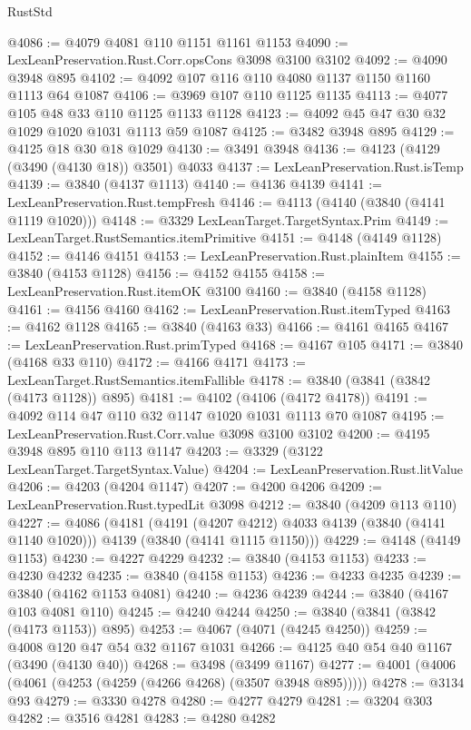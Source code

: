 \begin{lexlean}{RustStd}
\begin{coremodule}
@4086 := @4079 @4081 @110 @1151 @1161 @1153
@4090 := LexLeanPreservation.Rust.Corr.opsCons @3098 @3100 @3102
@4092 := @4090 @3948 @895
@4102 := @4092 @107 @116 @110 @4080 @1137 @1150 @1160 @1113 @64 @1087
@4106 := @3969 @107 @110 @1125 @1135
@4113 := @4077 @105 @48 @33 @110 @1125 @1133 @1128
@4123 := @4092 @45 @47 @30 @32 @1029 @1020 @1031 @1113 @59 @1087
@4125 := @3482 @3948 @895
@4129 := @4125 @18 @30 @18 @1029
@4130 := @3491 @3948
@4136 := @4123 (@4129 (@3490 (@4130 @18)) @3501) @4033
@4137 := LexLeanPreservation.Rust.isTemp
@4139 := @3840 (@4137 @1113)
@4140 := @4136 @4139
@4141 := LexLeanPreservation.Rust.tempFresh
@4146 := @4113 (@4140 (@3840 (@4141 @1119 @1020)))
@4148 := @3329 LexLeanTarget.TargetSyntax.Prim
@4149 := LexLeanTarget.RustSemantics.itemPrimitive
@4151 := @4148 (@4149 @1128)
@4152 := @4146 @4151
@4153 := LexLeanPreservation.Rust.plainItem
@4155 := @3840 (@4153 @1128)
@4156 := @4152 @4155
@4158 := LexLeanPreservation.Rust.itemOK @3100
@4160 := @3840 (@4158 @1128)
@4161 := @4156 @4160
@4162 := LexLeanPreservation.Rust.itemTyped
@4163 := @4162 @1128
@4165 := @3840 (@4163 @33)
@4166 := @4161 @4165
@4167 := LexLeanPreservation.Rust.primTyped
@4168 := @4167 @105
@4171 := @3840 (@4168 @33 @110)
@4172 := @4166 @4171
@4173 := LexLeanTarget.RustSemantics.itemFallible
@4178 := @3840 (@3841 (@3842 (@4173 @1128)) @895)
@4181 := @4102 (@4106 (@4172 @4178))
@4191 := @4092 @114 @47 @110 @32 @1147 @1020 @1031 @1113 @70 @1087
@4195 := LexLeanPreservation.Rust.Corr.value @3098 @3100 @3102
@4200 := @4195 @3948 @895 @110 @113 @1147
@4203 := @3329 (@3122 LexLeanTarget.TargetSyntax.Value)
@4204 := LexLeanPreservation.Rust.litValue
@4206 := @4203 (@4204 @1147)
@4207 := @4200 @4206
@4209 := LexLeanPreservation.Rust.typedLit @3098
@4212 := @3840 (@4209 @113 @110)
@4227 := @4086
    (@4181
      (@4191 (@4207 @4212) @4033 @4139 (@3840 (@4141 @1140 @1020)))
      @4139
      (@3840 (@4141 @1115 @1150)))
@4229 := @4148 (@4149 @1153)
@4230 := @4227 @4229
@4232 := @3840 (@4153 @1153)
@4233 := @4230 @4232
@4235 := @3840 (@4158 @1153)
@4236 := @4233 @4235
@4239 := @3840 (@4162 @1153 @4081)
@4240 := @4236 @4239
@4244 := @3840 (@4167 @103 @4081 @110)
@4245 := @4240 @4244
@4250 := @3840 (@3841 (@3842 (@4173 @1153)) @895)
@4253 := @4067 (@4071 (@4245 @4250))
@4259 := @4008 @120 @47 @54 @32 @1167 @1031
@4266 := @4125 @40 @54 @40 @1167 (@3490 (@4130 @40))
@4268 := @3498 (@3499 @1167)
@4277 := @4001 (@4006 (@4061 (@4253 (@4259 (@4266 @4268) (@3507 @3948 @895)))))
@4278 := @3134 @93
@4279 := @3330 @4278
@4280 := @4277 @4279
@4281 := @3204 @303
@4282 := @3516 @4281
@4283 := @4280 @4282

\end{coremodule}
\end{lexlean}
